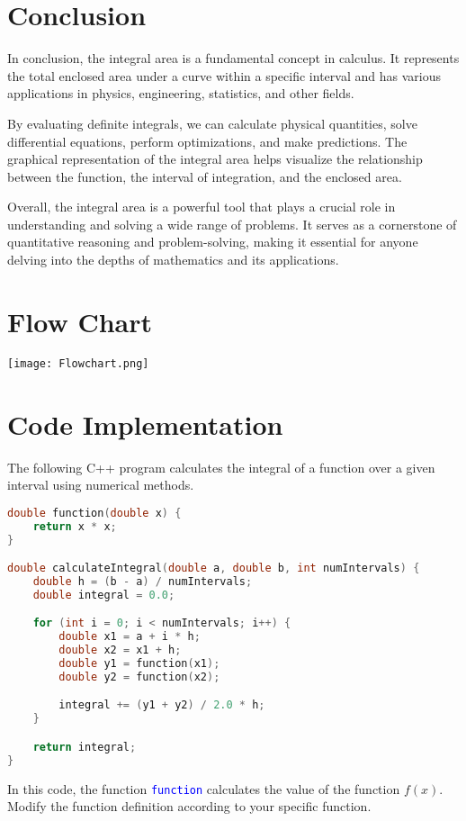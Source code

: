 \documentclass{article}
\begin{document}
\section{Conclusion}

In conclusion, the integral area is a fundamental concept in calculus. It represents the total enclosed area under a curve within a specific interval and has various applications in physics, engineering, statistics, and other fields.

By evaluating definite integrals, we can calculate physical quantities, solve differential equations, perform optimizations, and make predictions. The graphical representation of the integral area helps visualize the relationship between the function, the interval of integration, and the enclosed area.

Overall, the integral area is a powerful tool that plays a crucial role in understanding and solving a wide range of problems. It serves as a cornerstone of quantitative reasoning and problem-solving, making it essential for anyone delving into the depths of mathematics and its applications.

\section{Flow Chart}
 \texttt{[image: Flowchart.png]}
\section{Code Implementation}
The following C++ program calculates the integral of a function over a given interval using numerical methods.

\begin{lstlisting}[language=C++, backgroundcolor=\color{blue!5}, basicstyle=\footnotesize]
double function(double x) {
    return x * x;
}

double calculateIntegral(double a, double b, int numIntervals) {
    double h = (b - a) / numIntervals;
    double integral = 0.0;

    for (int i = 0; i < numIntervals; i++) {
        double x1 = a + i * h;
        double x2 = x1 + h;
        double y1 = function(x1);
        double y2 = function(x2);

        integral += (y1 + y2) / 2.0 * h;
    }

    return integral;
}
\end{lstlisting}


In this code, the function \textcolor{blue}{\texttt{function}} calculates the value of the function $f(x)$. Modify the function definition according to your specific function. \\
\end{document}
